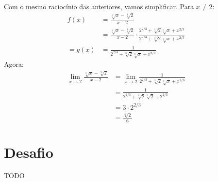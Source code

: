 \documentclass[12pt]{article}
\begin{document}
\subsection{}
Com o mesmo raciocínio das anteriores, vamos simplificar. Para \(x \ne 2\):
\begin{align*}
	f(x)
	&= \frac{\sqrt[3]{x}-\sqrt[3]{2}}{x-2} \\
	&= \frac{\sqrt[3]{x}-\sqrt[3]{2}}{x-2}\cdot\frac{2^{2/3}+\sqrt[3]{2}\sqrt[3]{x}+x^{2/3}}{2^{2/3}+\sqrt[3]{2}\sqrt[3]{x}+x^{2/3}} \\
	= g(x)
	&= \frac{1}{2^{2/3}+\sqrt[3]{2}\sqrt[3]{x}+x^{2/3}}
\end{align*}
Agora:
\begin{align*}
	\lim_{x\rightarrow 2} \frac{\sqrt[3]{x}-\sqrt[3]{2}}{x-2}
	&= \lim_{x\rightarrow 2} \frac{1}{2^{2/3}+\sqrt[3]{2}\sqrt[3]{x}+x^{2/3}} \\
	&= \frac{1}{2^{2/3}+\sqrt[3]{2}\sqrt[3]{2}+2^{2/3}} \\
	&= 3\cdot2^{2/3} \\
	&= \frac{\sqrt[3]{2}}{6}
\end{align*}
\section{Desafio}
TODO
\end{document}
